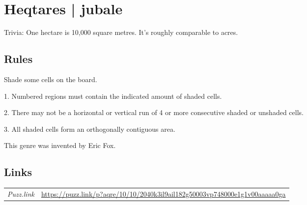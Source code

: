 \section[Heqtares | jubale {[\emph{Aqre}]}]{Heqtares | {\normalfont jubale}}
\label{sec:48-heqtares-jubale}
Trivia: One hectare is 10,000 square metres.  It’s roughly comparable to acres.
\subsection*{Rules}
\begin{markdown}
Shade some cells on the board.



1. Numbered regions must contain the indicated amount of shaded cells.



2. There may not be a horizontal or vertical run of 4 or more consecutive shaded or unshaded cells.



3. All shaded cells form an orthogonally contiguous area.



This genre was invented by Eric Fox.
\end{markdown}
\subsection*{Links}
\begin{tabularx}{\textwidth}{l X}
\emph{Puzz.link} & \url{https://puzz.link/p?aqre/10/10/2040k3il9ail182g50003vp748000e1g1v00aaaaa0ga} \\
\end{tabularx}
\pagebreak
